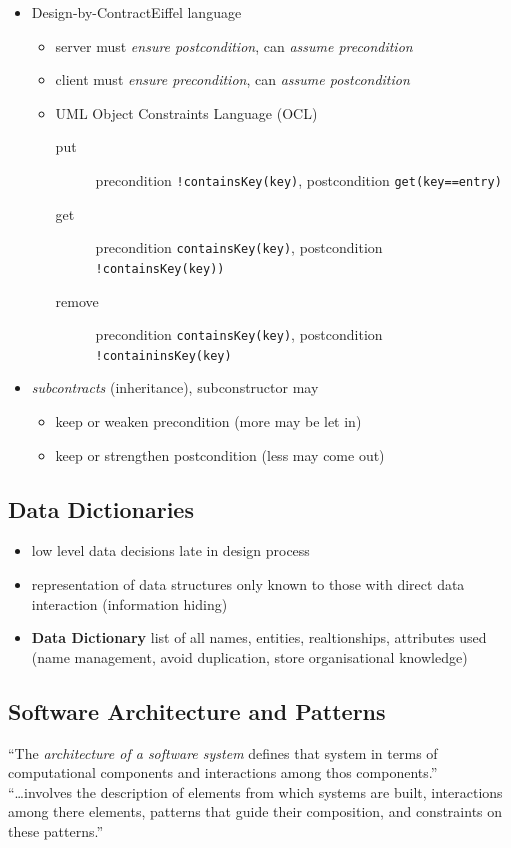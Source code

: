 \documentclass[a4paper, 10pt]{article}
\begin{document}
\begin{itemize}
\begin{itemize}
\begin{description}
		\end{description}
 	\end{itemize}
 	\item Design-by-Contract\texttrademark \follows Eiffel language
 	\begin{itemize}
 		\item server must \emph{ensure postcondition}, can \emph{assume precondition}
 		\item client must \emph{ensure precondition}, can \emph{assume postcondition}
 		\item UML Object Constraints Language (OCL) \\
 		
 		\begin{description}
 			\item[put] precondition \texttt{!containsKey(key)}, postcondition \texttt{get(key==entry)}
 			\item[get] precondition \texttt{containsKey(key)}, postcondition \texttt{!containsKey(key))}
 			\item[remove] precondition \texttt{containsKey(key)}, postcondition \texttt{!containinsKey(key)}
 		\end{description}
 	\end{itemize}
 	\item \emph{subcontracts} (inheritance), subconstructor may
 	\begin{itemize}
 		\item keep or weaken precondition (more may be let in)
 		\item keep or strengthen postcondition (less may come out)
 	\end{itemize}
 \end{itemize}

\subsection*{Data Dictionaries}
\begin{itemize}
	\item low level data decisions \follows late in design process
	\item representation of data structures only known to those with direct data interaction (information hiding)
	\item \textbf{Data Dictionary} list of all names, entities, realtionships, attributes used (name management, avoid duplication, store organisational knowledge)
\end{itemize}

\subsection*{Software Architecture and Patterns}
\begin{shaded}
``The \emph{architecture of a software system} defines that system in terms of computational components and interactions among thos components.'' \\
``\dots involves the description of elements from which systems are built, interactions among there elements, patterns that guide their composition, and constraints on these patterns.''
\end{shaded}
\end{document}
